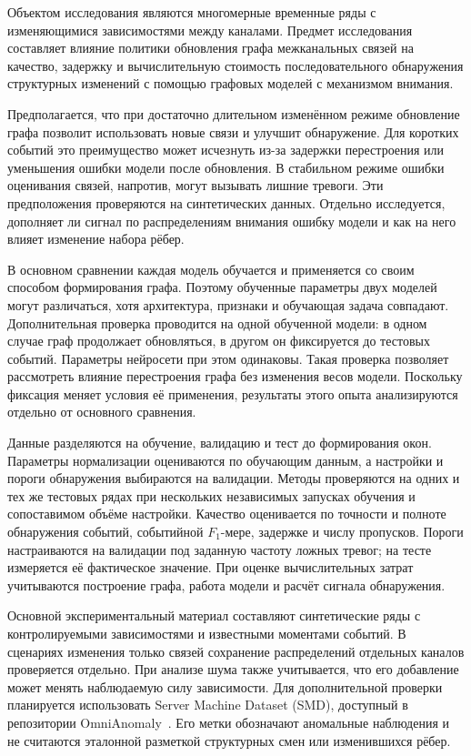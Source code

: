 \documentclass[bachelor, och, diploma]{SCWorks}
\begin{document}
Объектом исследования являются многомерные временные ряды с изменяющимися зависимостями между каналами. Предмет исследования составляет влияние политики обновления графа межканальных связей на качество, задержку и вычислительную стоимость последовательного обнаружения структурных изменений с помощью графовых моделей с механизмом внимания.

Предполагается, что при достаточно длительном изменённом режиме обновление графа позволит использовать новые связи и улучшит обнаружение. Для коротких событий это преимущество может исчезнуть из-за задержки перестроения или уменьшения ошибки модели после обновления. В стабильном режиме ошибки оценивания связей, напротив, могут вызывать лишние тревоги. Эти предположения проверяются на синтетических данных. Отдельно исследуется, дополняет ли сигнал по распределениям внимания ошибку модели и как на него влияет изменение набора рёбер.

В основном сравнении каждая модель обучается и применяется со своим способом формирования графа. Поэтому обученные параметры двух моделей могут различаться, хотя архитектура, признаки и обучающая задача совпадают. Дополнительная проверка проводится на одной обученной модели: в одном случае граф продолжает обновляться, в другом он фиксируется до тестовых событий. Параметры нейросети при этом одинаковы. Такая проверка позволяет рассмотреть влияние перестроения графа без изменения весов модели. Поскольку фиксация меняет условия её применения, результаты этого опыта анализируются отдельно от основного сравнения.

Данные разделяются на обучение, валидацию и тест до формирования окон. Параметры нормализации оцениваются по обучающим данным, а настройки и пороги обнаружения выбираются на валидации. Методы проверяются на одних и тех же тестовых рядах при нескольких независимых запусках обучения и сопоставимом объёме настройки. Качество оценивается по точности и полноте обнаружения событий, событийной $F_1$-мере, задержке и числу пропусков. Пороги настраиваются на валидации под заданную частоту ложных тревог; на тесте измеряется её фактическое значение. При оценке вычислительных затрат учитываются построение графа, работа модели и расчёт сигнала обнаружения.

Основной экспериментальный материал составляют синтетические ряды с контролируемыми зависимостями и известными моментами событий. В сценариях изменения только связей сохранение распределений отдельных каналов проверяется отдельно. При анализе шума также учитывается, что его добавление может менять наблюдаемую силу зависимости. Для дополнительной проверки планируется использовать Server Machine Dataset (SMD), доступный в репозитории OmniAnomaly~\cite{omnianomalyrepository}. Его метки обозначают аномальные наблюдения и не считаются эталонной разметкой структурных смен или изменившихся рёбер.
\end{document}
